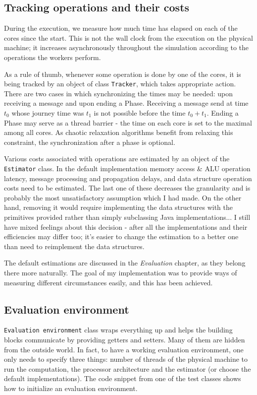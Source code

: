 \documentclass[12pt,a4paper,twoside,openright]{report}
\begin{document}
\subsection{Tracking operations and their costs}
During the execution, we measure how much time has elapsed on each of the cores since the start. This is not the wall clock from the execution on the physical machine; it increases asynchronously throughout the simulation according to the operations the workers perform.

As a rule of thumb, whenever some operation is done by one of the cores, it is being tracked by an object of class \texttt{Tracker}, which takes appropriate action. There are two cases in which synchronizing the times may be needed: upon receiving a message and upon ending a Phase. Receiving a message send at time $t_0$ whose journey time was $t_1$ is not possible before the time $t_0+t_1$. Ending a Phase may serve as a thread barrier - the time on each core is set to the maximal among all cores. As chaotic relaxation algorithms benefit from relaxing this constraint, the synchronization after a phase is optional.

Various costs associated with operations are estimated by an object of the \texttt{Estimator} class. In the default implementation memory access \& ALU operation latency, message processing and propagation delays, and data structure operation costs need to be estimated. The last one of these decreases the granularity and is probably the most unsatisfactory assumption which I had made. On the other hand, removing it would require implementing the data structures with the primitives provided rather than simply subclassing Java implementations... I still have mixed feelings about this decision - after all the implementations and their efficiencies may differ too; it's easier to change the estimation to a better one than need to reimplement the data structures.

The default estimations are discussed in the \textit{Evaluation} chapter, as they belong there more naturally. The goal of my implementation was to provide ways of measuring different circumstances easily, and this has been achieved.

\subsection{Evaluation environment}
\texttt{Evaluation environment} class wraps everything up and helps the building blocks communicate by providing getters and setters. Many of them are hidden from the outside world. In fact, to have a working evaluation environment, one only needs to specify three things: number of threads of the physical machine to run the computation, the processor architecture and the estimator (or choose the default implementations). The code snippet from one of the test classes shows how to initialize an evaluation environment. 
\end{document}
